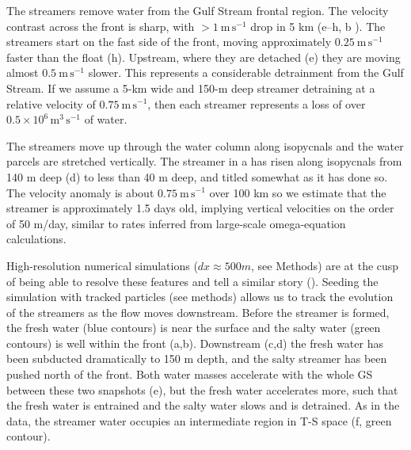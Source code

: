 \documentclass{natureJMK}
\begin{document}
The streamers remove water from the Gulf Stream frontal region.  The velocity contrast across the front is  sharp, with $>1\ \mathrm{m\,s^{-1}}$ drop in 5 km (e--h, b ).  The streamers start on the fast side of the front, moving approximately $0.25\ \mathrm{m\,s^{-1}}$ faster than the float (h). Upstream, where they are detached (e) they are moving almost $0.5\ \mathrm{m\,s^{-1}}$ slower.  This represents a considerable detrainment from the Gulf Stream.  If we assume a 5-km wide and 150-m deep streamer detraining at a relative velocity of $0.75\ \mathrm{m\,s^{-1}}$, then each streamer represents a loss of over $0.5\times10^{6}\, \mathrm{m^{3}\,s^{-1}}$ of water.  

The streamers move up through the water column along isopycnals and the water parcels are stretched vertically. The streamer in a has risen along isopycnals from 140 m deep (d)  to less than 40 m deep, and titled somewhat as it has done so.   The velocity anomaly is about $0.75\ \mathrm{m\,s^{-1}}$ over 100 km so we estimate that the streamer is approximately 1.5 days old,  implying vertical velocities on the order of 50 m/day, similar to rates inferred from large-scale omega-equation calculations\cite{thomasjoyce10}.  

High-resolution numerical simulations ($dx\approx 500 m$, see Methods) are at the cusp of being able to resolve these features and tell a similar story (). Seeding the simulation with tracked particles (see methods) allows us to track the evolution of the streamers as the flow moves downstream.  Before the streamer is formed, the fresh water (blue contours) is near the surface and the salty water (green contours) is well within the front (a,b).  Downstream (c,d) the fresh water has been subducted dramatically to 150 m depth, and the salty streamer has been pushed north of the front.  Both water masses accelerate with the whole GS between these two snapshots (e), but the fresh water accelerates more, such that the fresh water is entrained and the salty water slows and is detrained.  As in the data, the streamer water occupies an intermediate region in T-S space (f, green contour).  
\end{document}
